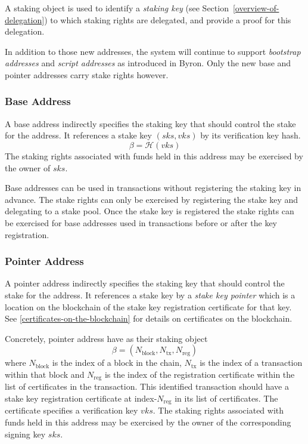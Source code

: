 \documentclass[11pt,a4paper]{article}
\begin{document}
A staking object is used to identify a \emph{staking key} (see
Section~\ref{overview-of-delegation}) to which staking rights are delegated,
and provide a proof for this delegation.

In addition to those new addresses, the system will continue to support
\emph{bootstrap addresses} and \emph{script addresses} as introduced in
Byron. Only the new base and pointer addresses carry stake rights
however.

\subsubsection{Base Address}
\label{base-address}

A base address indirectly specifies the staking key that should
control the stake for the address. It references a stake key
\((sks, vks)\) by its verification key hash.
\[
\beta = \mathcal{H}(vks)
\]
The staking rights associated with funds held in this address may be
exercised by the owner of \(sks\).

Base addresses can be used in transactions without registering the
staking key in advance. The stake rights can only be exercised by
registering the stake key and delegating to a stake pool. Once the
stake key is registered the stake rights can be exercised for base
addresses used in transactions before or after the key registration.

\subsubsection{Pointer Address}
\label{pointer-address}

A pointer address indirectly specifies the staking key that should
control the stake for the address. It references a stake key by a
\emph{stake key pointer} which is a location on the blockchain of the
stake key registration certificate for that key. See
\cref{certificates-on-the-blockchain} for details on certificates on the
blockchain.

Concretely, pointer address have as their staking object
\[
\beta = (N_\text{block}, N_\text{tx}, N_\text{reg})
\]
where \(N_\text{block}\) is the index of a block in the chain,
\(N_\text{tx}\) is the index of a transaction within that block and
\(N_\text{reg}\) is the index of the registration certificate within
the list of certificates in the transaction. This identified
transaction should have a stake key registration certificate at
index-\(N_\text{reg}\) in its list of certificates. The certificate
specifies a verification key \(vks\). The staking rights associated
with funds held in this address may be exercised by the owner of the
corresponding signing key \(sks\).
\end{document}

